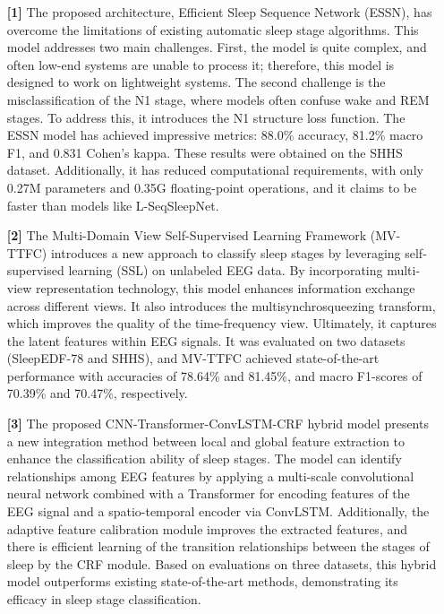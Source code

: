 \begin{enumerate}
    \item[\textbf{[1]}] The proposed architecture, Efficient Sleep Sequence Network (ESSN), has overcome the limitations of existing automatic sleep stage algorithms. This model addresses two main challenges. First, the model is quite complex, and often low-end systems are unable to process it; therefore, this model is designed to work on lightweight systems. The second challenge is the misclassification of the N1 stage, where models often confuse wake and REM stages. To address this, it introduces the N1 structure loss function. The ESSN model has achieved impressive metrics: 88.0\% accuracy, 81.2\% macro F1, and 0.831 Cohen’s kappa. These results were obtained on the SHHS dataset. Additionally, it has reduced computational requirements, with only 0.27M parameters and 0.35G floating-point operations, and it claims to be faster than models like L-SeqSleepNet.
    
    \item[\textbf{[2]}] The Multi-Domain View Self-Supervised Learning Framework (MV-TTFC) introduces a new approach to classify sleep stages by leveraging self-supervised learning (SSL) on unlabeled EEG data. By incorporating multi-view representation technology, this model enhances information exchange across different views. It also introduces the multisynchrosqueezing transform, which improves the quality of the time-frequency view. Ultimately, it captures the latent features within EEG signals. It was evaluated on two datasets (SleepEDF-78 and SHHS), and MV-TTFC achieved state-of-the-art performance with accuracies of 78.64\% and 81.45\%, and macro F1-scores of 70.39\% and 70.47\%, respectively.
    
    \item[\textbf{[3]}] The proposed CNN-Transformer-ConvLSTM-CRF hybrid model presents a new integration method between local and global feature extraction to enhance the classification ability of sleep stages. The model can identify relationships among EEG features by applying a multi-scale convolutional neural network combined with a Transformer for encoding features of the EEG signal and a spatio-temporal encoder via ConvLSTM. Additionally, the adaptive feature calibration module improves the extracted features, and there is efficient learning of the transition relationships between the stages of sleep by the CRF module. Based on evaluations on three datasets, this hybrid model outperforms existing state-of-the-art methods, demonstrating its efficacy in sleep stage classification.
\end{enumerate}


